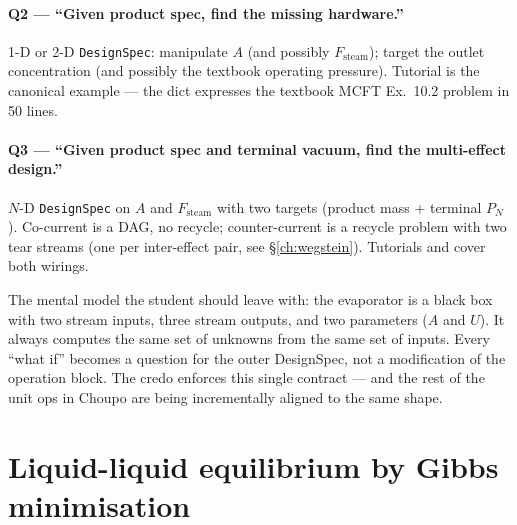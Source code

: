 \documentclass[11pt,a4paper]{article}
\begin{document}
\paragraph{Q2 --- ``Given product spec, find the missing
            hardware.''}
1-D or 2-D \texttt{DesignSpec}: manipulate $A$ (and possibly
$F_{\!\text{steam}}$); target the outlet concentration (and
possibly the textbook operating pressure).  Tutorial
 is the canonical
example --- the dict expresses the textbook MCFT Ex.~10.2
problem in 50 lines.

\paragraph{Q3 --- ``Given product spec and terminal vacuum,
            find the multi-effect design.''}
$N$-D \texttt{DesignSpec} on $A$ and $F_{\!\text{steam}}$ with
two targets (product mass + terminal $P_N$).  Co-current is a
DAG, no recycle; counter-current is a recycle problem with two
tear streams (one per inter-effect pair, see
\S\ref{ch:wegstein}).  Tutorials
 and
 cover both wirings.

\begin{intuition}
The mental model the student should leave with: the evaporator is a black box with two stream inputs, three stream
outputs, and two parameters ($A$ and $U$).  It always computes
the same set of unknowns from the same set of inputs.  Every
``what if'' becomes a question for the outer DesignSpec, not a
modification of the operation block.  The credo enforces this
single contract --- and the rest of the unit ops in Choupo are
being incrementally aligned to the same shape.
\end{intuition}

\section{Liquid-liquid equilibrium by Gibbs minimisation}\label{ch:lle-gibbs}
\end{document}
